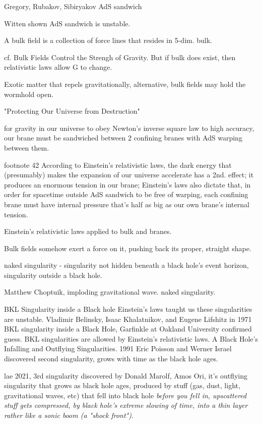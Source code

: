 \documentclass[10pt]{amsart}
\begin{document}
Gregory, Rubakov, Sibiryakov AdS sandwich

Witten shown AdS sandwich is unstable.

A bulk field is a collection of force lines that resides in 5-dim. bulk.

cf. Bulk Fields Control the Strengh of Gravity. But if bulk does exist, then relativistic laws allow G to change.

Exotic matter that repels gravitationally,
alternative, bulk fields may hold the wormhold open.

"Protecting Our Universe from Destruction"

for gravity in our universe to obey Newton's inverse square law to high accuracy, our brane must be sandwiched between 2 confining branes with AdS warping between them.

footnote 42 
According to Einstein's relativistic laws, the dark energy that (presumably) makes the expansion of our universe accelerate has a 2nd. effect; it produces an enormous tension in our brane; Einstein's laws also dictate that, in order for spacetime outside AdS sandwich to be free of warping, each confining brane must have internal pressure that's half as big as our own brane's internal tension.

Einstein's relativistic laws applied to bulk and branes.

Bulk fields somehow exert a force on it, pushing back its proper, straight shape.

naked singularity - singularity not hidden beneath a black hole's event horizon, singularity outside a black hole.

Matthew Choptuik, imploding gravitational wave. naked singularity.

BKL Singularity inside a Black hole
Einstein's laws taught us these singularities are unstable. Vladimir Belinsky, Isaac Khalatnikov, and Eugene Lifshitz in 1971 BKL singularity inside a Black Hole, Garfinkle at Oakland University confirmed guess. 
BKL singularities are allowed by Einstein's relativistic laws.
A Black Hole's Infalling and Outflying Singularities.
1991 Eric Poisson and Werner Israel discovered second singularity, grows with time as the black hole ages.

lae 2021, 3rd singularity discovered by Donald Marolf, Amos Ori, it's outflying singularity that grows as black hole ages, produced by stuff (gas, dust, light, gravitational waves, etc) that fell into black hole \emph{before you fell in, upscattered stuff gets compressed, by black hole's extreme slowing of time, into a thin layer rather like a sonic boom (a "shock front")}.
\end{document}
